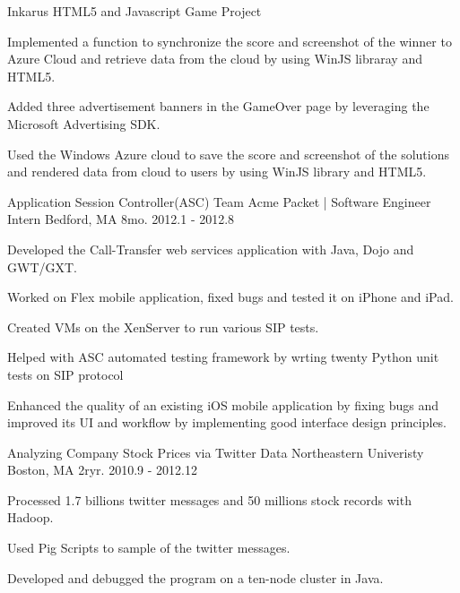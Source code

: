 \begin{cventries}
\cventry
{Inkarus HTML5 and Javascript Game Project} %
{} %
{} %
{} %
{ %
\begin{cvitems}
\item {Implemented a function to synchronize the score and screenshot of the winner to Azure Cloud and retrieve
data from the cloud by using WinJS libraray and HTML5.}
\item {Added three advertisement banners in the GameOver page by leveraging the Microsoft Advertising SDK}.
\item {Used the Windows Azure cloud to save the score and screenshot of the solutions and rendered data from cloud to users by using WinJS library and HTML5.}
\end{cvitems} 
}


\cventry
{Application Session Controller(ASC) Team} %
{Acme Packet | Software Engineer Intern} %
{Bedford, MA} %
{8mo. 2012.1 - 2012.8} %
{ %
\begin{cvitems}
\item { Developed the Call-Transfer web services application with Java, Dojo and GWT/GXT.}
\item { Worked on Flex mobile application, fixed bugs and tested it on iPhone and iPad.}
\item { Created VMs on the XenServer to run various SIP tests.}
\item { Helped with ASC automated testing framework by wrting twenty Python unit tests on SIP protocol}
\item { Enhanced the quality of an existing iOS mobile application by fixing bugs and improved its UI and workflow by implementing good interface design principles.}
\end{cvitems}
}


\cventry
{Analyzing Company Stock Prices via Twitter Data} %
{Northeastern Univeristy} %
{Boston, MA} %
{2ryr. 2010.9 - 2012.12} %
{ %
\begin{cvitems}
\item {Processed 1.7 billions twitter messages and 50 millions stock records with Hadoop.}
\item {Used Pig Scripts to sample of the twitter messages.}
\item {Developed and debugged the program on a ten-node cluster in Java.}
\end{cvitems}
}


\end{cventries}
